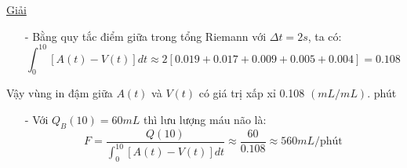 \documentclass[12pt,a4paper]{article}
\begin{document}
\begin{enumerate}[a/]
\begin{itemize}
          \end{itemize}
          \centering\underline{Giải}
          \begin{itemize}
            \item[-] Bằng quy tắc điểm giữa trong tổng Riemann với $\Delta t=2s$, ta có:
            $$\int_{0}^{10}\left[A(t)-V(t)\right]dt\approx 2\left[0.019+0.017+0.009+0.005+0.004\right]=0.108$$
          \end{itemize}
          \begin{flushleft}
            Vậy vùng in đậm giữa $A(t)$ và $V(t)$ có giá trị xấp xỉ 0.108 $(mL/mL)$. phút
          \end{flushleft}
          \begin{itemize}
            \item[-] Với $Q_B(10)=60mL$ thì lưu lượng máu não là:
            $$F=\frac{Q(10)}{\displaystyle \int_{0}^{10}\left[A(t)-V(t)\right]dt} \approx \frac{60}{0.108} \approx 560mL/\text{phút}$$
          \end{itemize}
\end{enumerate}

\newpage
\end{document}
